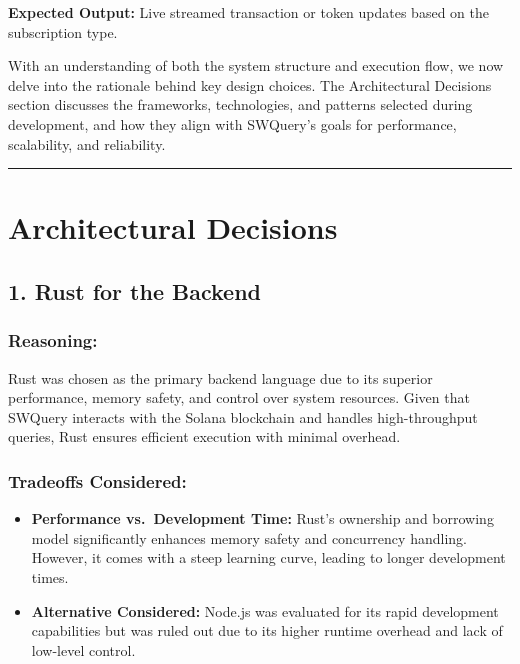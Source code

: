 \documentclass[
]{article}
\providecommand{\tightlist}{%
  \setlength{\itemsep}{0pt}\setlength{\parskip}{0pt}}
\begin{document}
\textbf{Expected Output:} Live streamed transaction or token updates based on the subscription type.

With an understanding of both the system structure and execution flow, we now delve into the rationale behind key design choices. The Architectural Decisions section discusses the frameworks, technologies, and patterns selected during development, and how they align with SWQuery’s goals for performance, scalability, and reliability.

\begin{center}\rule{0.5\linewidth}{0.5pt}\end{center}

\hypertarget{architectural-decisions}{%
\section{Architectural Decisions}\label{architectural-decisions}}

\hypertarget{rust-for-the-backend}{%
\subsection{1. Rust for the Backend}\label{rust-for-the-backend}}

\hypertarget{reasoning}{%
\subsubsection{\texorpdfstring{\textbf{Reasoning:}}{Reasoning:}}\label{reasoning}}

Rust was chosen as the primary backend language due to its superior
performance, memory safety, and control over system resources. Given
that SWQuery interacts with the Solana blockchain and handles
high-throughput queries, Rust ensures efficient execution with minimal
overhead.

\hypertarget{tradeoffs-considered}{%
\subsubsection{\texorpdfstring{\textbf{Tradeoffs
Considered:}}{Tradeoffs Considered:}}\label{tradeoffs-considered}}

\begin{itemize}
\tightlist
\item
  \textbf{Performance vs.~Development Time:} Rust's ownership and
  borrowing model significantly enhances memory safety and concurrency
  handling. However, it comes with a steep learning curve, leading to
  longer development times.
\item
  \textbf{Alternative Considered:} Node.js was evaluated for its rapid
  development capabilities but was ruled out due to its higher runtime
  overhead and lack of low-level control.
\end{itemize}
\end{document}
